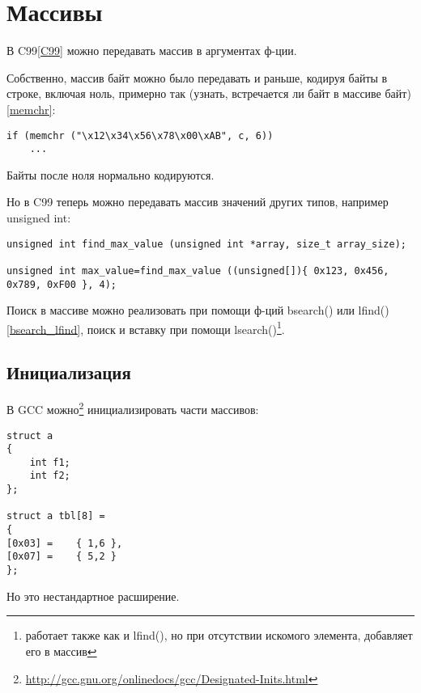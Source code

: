 ﻿\section{Массивы}

В C99\ref{C99} можно передавать массив в аргументах ф-ции.

Собственно, массив байт можно было передавать и раньше, кодируя байты в строке, включая ноль, примерно так
(узнать, встречается ли байт  в массиве байт)\ref{memchr}:

\begin{lstlisting}
if (memchr ("\x12\x34\x56\x78\x00\xAB", c, 6))
	...
\end{lstlisting}

Байты после ноля нормально кодируются.

Но в C99 теперь можно передавать массив значений других типов, например unsigned int:

\begin{lstlisting}
unsigned int find_max_value (unsigned int *array, size_t array_size);

unsigned int max_value=find_max_value ((unsigned[]){ 0x123, 0x456, 0x789, 0xF00 }, 4);
\end{lstlisting}

Поиск в массиве можно реализовать при помощи ф-ций bsearch() или lfind()\ref{bsearch_lfind}, 
поиск и вставку при помощи lsearch()\footnote{работает также как и lfind(), но при отсутствии искомого элемента,
добавляет его в массив}.

\subsection{Инициализация}

В GCC можно\footnote{\url{http://gcc.gnu.org/onlinedocs/gcc/Designated-Inits.html}} инициализировать части массивов:

\begin{lstlisting}
struct a
{
	int f1;
	int f2;
};
 
struct a tbl[8] =
{
[0x03] =	{ 1,6 },
[0x07] =	{ 5,2 } 
};
\end{lstlisting}

Но это нестандартное расширение.

